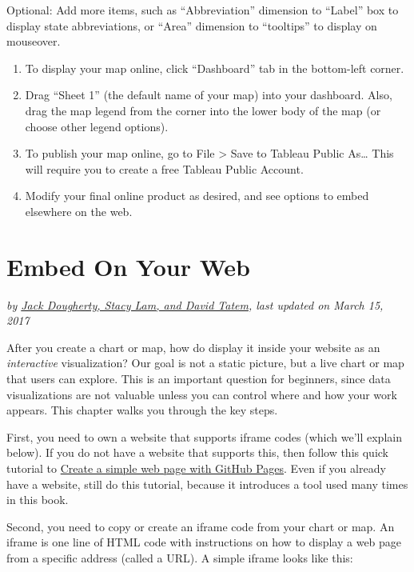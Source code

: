 \documentclass[
  english,
]{book}
\begin{document}
Optional: Add more items, such as ``Abbreviation'' dimension to ``Label'' box to display state abbreviations, or ``Area'' dimension to ``tooltips'' to display on mouseover.

\begin{enumerate}
\def\labelenumi{\arabic{enumi})}
\setcounter{enumi}{6}
\item
  To display your map online, click ``Dashboard'' tab in the bottom-left corner.
\item
  Drag ``Sheet 1'' (the default name of your map) into your dashboard. Also, drag the map legend from the corner into the lower body of the map (or choose other legend options).
\item
  To publish your map online, go to File \textgreater{} Save to Tableau Public As\ldots{} This will require you to create a free Tableau Public Account.
\item
  Modify your final online product as desired, and see options to embed elsewhere on the web.
\end{enumerate}

\hypertarget{embed}{%
\chapter{Embed On Your Web}\label{embed}}

\emph{by \href{authors}{Jack Dougherty, Stacy Lam, and David Tatem}, last updated on March 15, 2017}

After you create a chart or map, how do display it inside your website as an \emph{interactive} visualization? Our goal is not a static picture, but a live chart or map that users can explore. This is an important question for beginners, since data visualizations are not valuable unless you can control where and how your work appears. This chapter walks you through the key steps.

First, you need to own a website that supports iframe codes (which we'll explain below). If you do not have a website that supports this, then follow this quick tutorial to \href{github-pages}{Create a simple web page with GitHub Pages}. Even if you already have a website, still do this tutorial, because it introduces a tool used many times in this book.

Second, you need to copy or create an iframe code from your chart or map. An iframe is one line of HTML code with instructions on how to display a web page from a specific address (called a URL). A simple iframe looks like this:
\end{document}
